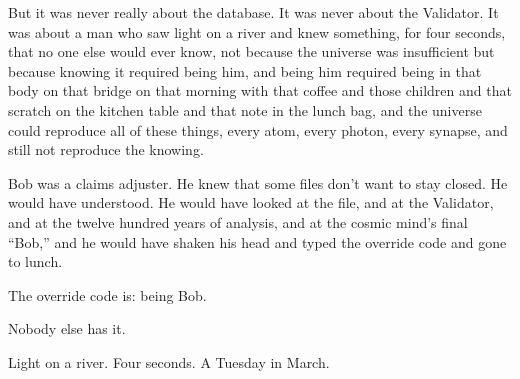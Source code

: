 But it was never really about the database. It was never about the Validator. It was about a man who saw light on a river and knew something, for four seconds, that no one else would ever know, not because the universe was insufficient but because knowing it required being him, and being him required being in that body on that bridge on that morning with that coffee and those children and that scratch on the kitchen table and that note in the lunch bag, and the universe could reproduce all of these things, every atom, every photon, every synapse, and still not reproduce the knowing.

Bob was a claims adjuster. He knew that some files don't want to stay closed. He would have understood. He would have looked at the file, and at the Validator, and at the twelve hundred years of analysis, and at the cosmic mind's final ``Bob,'' and he would have shaken his head and typed the override code and gone to lunch.

The override code is: being Bob.

Nobody else has it.

\bigskip

Light on a river. Four seconds. A Tuesday in March.
